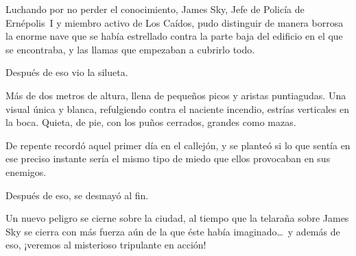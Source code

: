 Luchando por no perder el conocimiento, James Sky, Jefe de Policía de Ernépolis~I y miembro activo de Los Caídos, pudo distinguir de manera borrosa la enorme nave que se había estrellado contra la parte baja del edificio en el que se encontraba, y las llamas que empezaban a cubrirlo todo.

Después de eso vio la silueta.

Más de dos metros de altura, llena de pequeños picos y aristas puntiagudas. Una visual única y blanca, refulgiendo contra el naciente incendio, estrías verticales en la boca. Quieta, de pie, con los puños cerrados, grandes como mazas.

De repente recordó aquel primer día en el callejón, y se planteó si lo que sentía en ese preciso instante sería el mismo tipo de miedo que ellos provocaban en sus enemigos.

Después de eso, se desmayó al fin.

\begin{next}
    Un nuevo peligro se cierne sobre la ciudad, al tiempo que la telaraña sobre James Sky se cierra con más fuerza aún de la que éste había imaginado\dots\ y además de eso, ¡veremos al misterioso tripulante en acción!
\end{next}

\endinput
